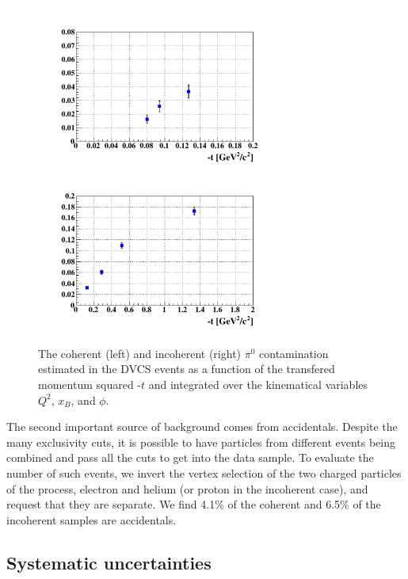 \documentclass{article}
\begin{document}
\begin{figure}[tbp]
\includegraphics[width=8cm]{fig3/T_ratio_pi0_dvcs_Coh_t.pdf}
\includegraphics[width=8cm]{fig3/T_ratio_pi0_dvcs_InCoh_t.pdf}
\caption{The coherent (left) and incoherent (right) $\pi^{0}$ 
contamination estimated in the DVCS events as a function of the 
transfered momentum squared -$t$ and integrated over the kinematical 
variables $Q^2$, $x_B$, and $\phi$.}
\label{fig:cont_yield}
\end{figure}

The second important source of background comes from accidentals. Despite the many exclusivity cuts, it is 
possible to have particles from different events being combined and pass all the cuts to get 
into the data sample. To evaluate the number of such events, we invert the vertex selection 
of the two charged 
particles of the process, electron and helium (or proton in the incoherent case), and request that they
are separate. We find 4.1\% of the coherent and 6.5\% of the incoherent samples are accidentals. 

\subsection{Systematic uncertainties}
\end{document}
